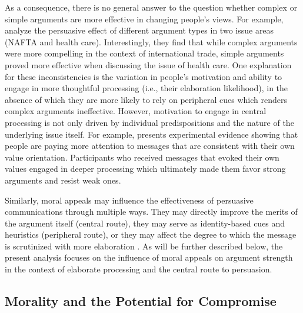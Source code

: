 As a consequence, there is no general answer to the question whether complex or simple arguments are more effective in changing people's views. For example, \citet{cobb1997changing} analyze the persuasive effect of different argument types in two issue areas (NAFTA and health care). Interestingly, they find that while complex arguments were more compelling in the context of international trade, simple arguments proved more effective when discussing the issue of health care. One explanation for these inconsistencies is the variation in people's motivation and ability to engage in more thoughtful processing (i.e., their elaboration likelihood), in the absence of which they are more likely to rely on peripheral cues which renders complex arguments ineffective. However, motivation to engage in central processing is not only driven by individual predispositions and the nature of the underlying issue itself. For example, \citet{nelson2005values} presents experimental evidence showing that people are paying more attention to messages that are consistent with their own value orientation. Participants who received messages that evoked their own values engaged in deeper processing which ultimately made them favor strong arguments and resist weak ones.

Similarly, moral appeals may influence the effectiveness of persuasive communications through multiple ways. They may directly improve the merits of the argument itself (central route), they may serve as identity-based cues and heuristics (peripheral route), or they may affect the degree to which the message is scrutinized with more elaboration \citep[see also][]{petty1986elaboration}. As will be further described below, the present analysis focuses on the influence of moral appeals on argument strength in the context of elaborate processing and the central route to persuasion.



\subsection{Morality and the Potential for Compromise}


